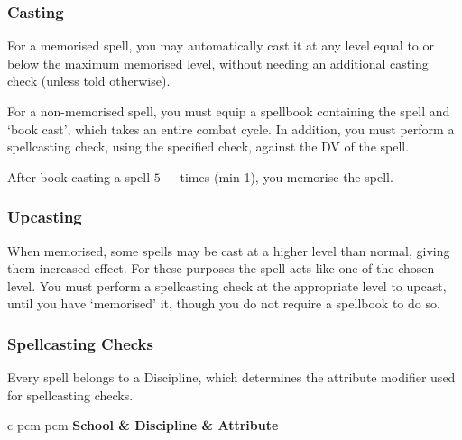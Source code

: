 \begin{landscape}
\begin{multicols}{3}
\subsubsection{Casting}

For a memorised spell, you may automatically cast it at any level equal to or below the maximum memorised level, without needing an additional casting check (unless told otherwise).

For a non-memorised spell, you must equip a spellbook containing the spell and `book cast', which takes an entire combat cycle. In addition, you must perform a spellcasting check, using the specified check, against the DV of the spell. 

After book casting a spell $5 - $\attIntShort{} times (min 1), you memorise the spell. 

\subsubsection{Upcasting}

When memorised, some spells may be cast at a higher level than normal, giving them increased effect. For these purposes the spell acts like one of the chosen level. You must perform a spellcasting check at the appropriate level to upcast, until you have `memorised' it, though you do not require a spellbook to do so.



\subsubsection{Spellcasting Checks}
Every spell belongs to a Discipline, which determines the attribute modifier used for spellcasting checks.
\begin{center}
	\begin{rndtable}{c p{\xS cm} p{\wS cm}}
	\bf School	&	\bf Discipline	&	\bf Attribute
	\\
	\\
	\\
	\\
   \\ 
	\\
	\\
	\end{rndtable}
\end{center}


\end{multicols}
\end{landscape}
